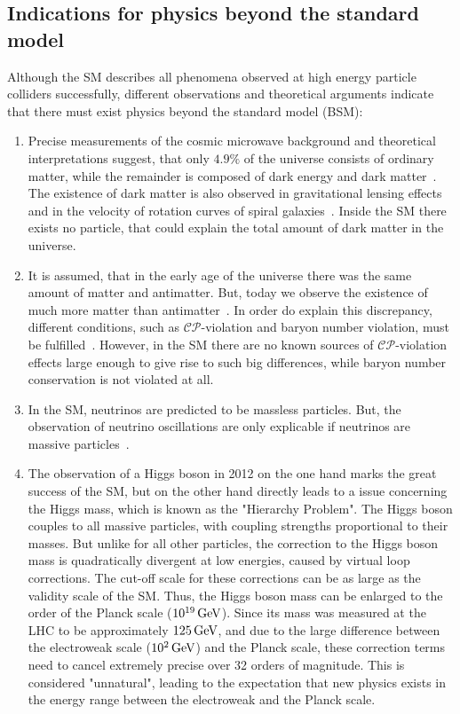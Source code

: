 \subsection*{Indications for physics beyond the standard model}\label{sec:SM_bsm}
Although the SM describes all phenomena observed at high energy particle colliders successfully, different observations and theoretical arguments indicate that there must exist physics beyond the standard model (BSM):
\begin{enumerate}
 \item Precise measurements of the cosmic microwave background and theoretical interpretations suggest, that only $4.9\%$ of the universe consists of ordinary matter, while the remainder is composed of dark energy and dark matter~\cite{DarkMatterPlanck}. The existence of dark matter is also observed in gravitational lensing effects~\cite{DarkMatterLensing} and in the velocity of rotation curves of spiral galaxies~\cite{DarkMatterRotation}. Inside the SM there exists no particle, that could explain the total amount of dark matter in the universe.
 \item It is assumed, that in the early age of the universe there was the same amount of matter and antimatter. But, today we observe the existence of much more matter than antimatter~\cite{Antimatter,AsymSM}. In order do explain this discrepancy, different conditions, such as $\mathcal{CP}$-violation and baryon number violation, must be fulfilled~\cite{Sakharov}. However, in the SM there are no known sources of $\mathcal{CP}$-violation effects large enough to give rise to such big differences, while baryon number conservation is not violated at all.
 \item In the SM, neutrinos are predicted to be massless particles. But, the observation of neutrino oscillations are only explicable if neutrinos are massive particles~\cite{NeutrinoMass,PDG}.
 \item The observation of a Higgs boson in 2012 on the one hand marks the great success of the SM, but on the other hand directly leads to a issue concerning the Higgs mass, which is known as the "Hierarchy Problem". The Higgs boson couples to all massive particles, with coupling strengths proportional to their masses. But unlike for all other particles, the correction to the Higgs boson mass is quadratically divergent at low energies, caused by virtual loop corrections. The cut-off scale for these corrections can be as large as the validity scale of the SM. Thus, the Higgs boson mass can be enlarged to the order of the Planck scale ($10^{19}\,\text{Ge\hspace{-.08em}V}$). Since its mass was measured at the LHC to be approximately $125\,\text{Ge\hspace{-.08em}V}$, and due to the large difference between the electroweak scale ($10^2\,\text{Ge\hspace{-.08em}V}$) and the Planck scale, these correction terms need to cancel extremely precise over 32 orders of magnitude. This is considered "unnatural", leading to the expectation that new physics exists in the energy range between the electroweak and the Planck scale.

\end{enumerate}
